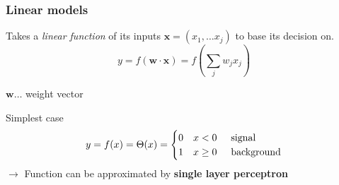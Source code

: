 \documentclass{beamer}
\begin{document}
\begin{frame}
    \frametitle{Linear models}
    Takes a \emph{linear function} of its inputs $\boldsymbol{x} = (x_{1},\dots x_{j})$ to base its decision on.\\
    $$ y = f (\boldsymbol{w} \cdot \boldsymbol{x}) = f (\sum_{j}w_{j}x_{j}) $$
    
    $\boldsymbol{w}\dots$ weight vector\\ 
    \vspace*{4mm}

    \pause
    Simplest case
    \[ 
         y = f(x)=\Theta(x)=
         \begin{cases} 
             0 & x < 0 \hspace*{5mm}\text{signal}\\
             1  & x \geq 0 \hspace*{5mm}\text{background}
        \end{cases} 
    \] 
    \pause
    \hspace*{5mm}$\to$ Function can be approximated by \textbf{single layer perceptron}
    
\end{frame} 

\end{document}
